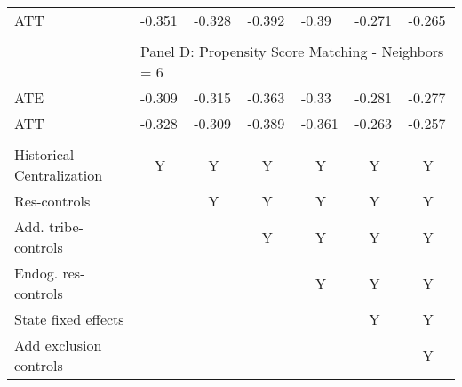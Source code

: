 \begin{table}[]
\begin{tabular}{lllllll}
ATT                    & -0.351               & -0.328                & -0.392                & -0.39                 & -0.271                & -0.265                \\
                       &                      &                       &                       &                       &                       &                       \\
                       & \multicolumn{6}{l}{Panel D: Propensity Score Matching - Neighbors = 6}                                                                       \\
ATE                    & -0.309               & -0.315                & -0.363                & -0.33                 & -0.281                & -0.277                \\
ATT                    & -0.328               & -0.309                & -0.389                & -0.361                & -0.263                & -0.257                \\
                       &                      &                       &                       &                       &                       &                       \\
Historical Centralization & \multicolumn{1}{c}{Y} & \multicolumn{1}{c}{Y} & \multicolumn{1}{c}{Y} & \multicolumn{1}{c}{Y} & \multicolumn{1}{c}{Y} & \multicolumn{1}{c}{Y} \\
Res-controls           & \multicolumn{1}{c}{} & \multicolumn{1}{c}{Y} & \multicolumn{1}{c}{Y} & \multicolumn{1}{c}{Y} & \multicolumn{1}{c}{Y} & \multicolumn{1}{c}{Y} \\
Add. tribe-controls    & \multicolumn{1}{c}{} & \multicolumn{1}{c}{}  & \multicolumn{1}{c}{Y} & \multicolumn{1}{c}{Y} & \multicolumn{1}{c}{Y} & \multicolumn{1}{c}{Y} \\
Endog. res-controls    & \multicolumn{1}{c}{} & \multicolumn{1}{c}{}  & \multicolumn{1}{c}{}  & \multicolumn{1}{c}{Y} & \multicolumn{1}{c}{Y} & \multicolumn{1}{c}{Y} \\
State fixed effects    & \multicolumn{1}{c}{} & \multicolumn{1}{c}{}  & \multicolumn{1}{c}{}  & \multicolumn{1}{c}{}  & \multicolumn{1}{c}{Y} & \multicolumn{1}{c}{Y} \\
Add exclusion controls & \multicolumn{1}{c}{} & \multicolumn{1}{c}{}  & \multicolumn{1}{c}{}  & \multicolumn{1}{c}{}  & \multicolumn{1}{c}{}  & \multicolumn{1}{c}{Y} \\ \hline
\end{tabular}
\end{table}